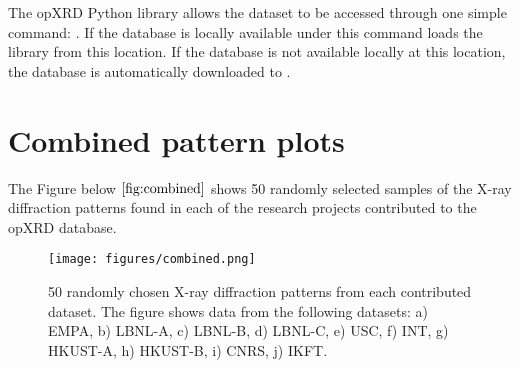 \documentclass[a4paper]{article}
\begin{document}
The opXRD Python library allows the dataset to be accessed through one simple command: . If the database is locally available under  this command loads the library from this location. If the database is not available locally at this location, the database is automatically downloaded to . 


\section*{Combined pattern plots}
The Figure below $\eqref{fig:combined}$ shows 50 randomly selected samples of the X-ray diffraction patterns found in each of the research projects contributed to the opXRD database.

\begin{figure}[!htb]
    \centering
    \texttt{[image: figures/combined.png]}
    \caption{50 randomly chosen X-ray diffraction patterns from each contributed dataset. The figure shows data from the following datasets: a) EMPA, b) LBNL-A, c) LBNL-B, d) LBNL-C, e) USC, f) INT, g) HKUST-A, h) HKUST-B, i) CNRS, j) IKFT.}
    \label{fig:combined}
\end{figure}

\pagebreak
\end{document}
